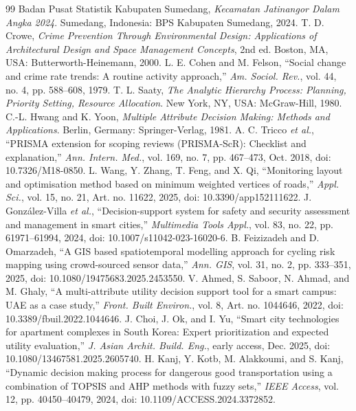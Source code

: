 \documentclass[10pt,twocolumn,a4paper]{article}
\begin{document}
\begin{thebibliography}{99}
\footnotesize
\setlength{\itemsep}{0pt}
 Badan Pusat Statistik Kabupaten Sumedang, \textit{Kecamatan Jatinangor Dalam Angka 2024}. Sumedang, Indonesia: BPS Kabupaten Sumedang, 2024.
 T. D. Crowe, \textit{Crime Prevention Through Environmental Design: Applications of Architectural Design and Space Management Concepts}, 2nd ed. Boston, MA, USA: Butterworth-Heinemann, 2000.
 L. E. Cohen and M. Felson, ``Social change and crime rate trends: A routine activity approach,'' \textit{Am. Sociol. Rev.}, vol. 44, no. 4, pp. 588--608, 1979.
 T. L. Saaty, \textit{The Analytic Hierarchy Process: Planning, Priority Setting, Resource Allocation}. New York, NY, USA: McGraw-Hill, 1980.
 C.-L. Hwang and K. Yoon, \textit{Multiple Attribute Decision Making: Methods and Applications}. Berlin, Germany: Springer-Verlag, 1981.
 A. C. Tricco \textit{et al.}, ``PRISMA extension for scoping reviews (PRISMA-ScR): Checklist and explanation,'' \textit{Ann. Intern. Med.}, vol. 169, no. 7, pp. 467--473, Oct. 2018, doi: 10.7326/M18-0850.
 L. Wang, Y. Zhang, T. Feng, and X. Qi, ``Monitoring layout and optimisation method based on minimum weighted vertices of roads,'' \textit{Appl. Sci.}, vol. 15, no. 21, Art. no. 11622, 2025, doi: 10.3390/app152111622.
 J. Gonz\'alez-Villa \textit{et al.}, ``Decision-support system for safety and security assessment and management in smart cities,'' \textit{Multimedia Tools Appl.}, vol. 83, no. 22, pp. 61971--61994, 2024, doi: 10.1007/s11042-023-16020-6.
 B. Feizizadeh and D. Omarzadeh, ``A GIS based spatiotemporal modelling approach for cycling risk mapping using crowd-sourced sensor data,'' \textit{Ann. GIS}, vol. 31, no. 2, pp. 333--351, 2025, doi: 10.1080/19475683.2025.2453550.
 V. Ahmed, S. Saboor, N. Ahmad, and M. Ghaly, ``A multi-attribute utility decision support tool for a smart campus: UAE as a case study,'' \textit{Front. Built Environ.}, vol. 8, Art. no. 1044646, 2022, doi: 10.3389/fbuil.2022.1044646.
 J. Choi, J. Ok, and I. Yu, ``Smart city technologies for apartment complexes in South Korea: Expert prioritization and expected utility evaluation,'' \textit{J. Asian Archit. Build. Eng.}, early access, Dec. 2025, doi: 10.1080/13467581.2025.2605740.
 H. Kanj, Y. Kotb, M. Alakkoumi, and S. Kanj, ``Dynamic decision making process for dangerous good transportation using a combination of TOPSIS and AHP methods with fuzzy sets,'' \textit{IEEE Access}, vol. 12, pp. 40450--40479, 2024, doi: 10.1109/ACCESS.2024.3372852.

\end{thebibliography}
\end{document}
